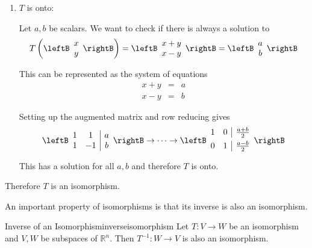\begin{solution}
\begin{enumerate}
\item $T$ is onto:

Let $a,b$ be scalars. We want to check if there is always a solution to 
\[
T  \left( \leftB \begin{array}{c}
x \\
y
\end{array} \rightB \right) = \leftB \begin{array}{c}
x + y\\
x - y 
\end{array} \rightB = \leftB \begin{array}{c}
a \\
b
\end{array} \rightB
\]

This can be represented as the system of equations 
\begin{eqnarray*}
x + y &=& a\\
x - y &=& b
\end{eqnarray*}

Setting up the augmented matrix and row reducing gives
\[
\leftB \begin{array}{cc|c}
1 & 1 & a \\
1 & -1 & b
\end{array} \rightB \rightarrow \cdots \rightarrow
\leftB \begin{array}{cc|c}
1 & 0 & \vspace{0.05in}\frac{a+b}{2} \\
0 & 1 & \vspace{0.05in}\frac{a-b}{2}
\end{array} \rightB
\]
This has a solution for all $a,b$ and therefore $T$ is onto. 
\end{enumerate}

Therefore $T$ is an isomorphism.
\end{solution}

An important property of isomorphisms is that its inverse is also an isomorphism. 

\begin{proposition}{Inverse of an Isomorphism}{inverseisomorphism}
Let $T:V\rightarrow W$ be an isomorphism and $V,W$ be subspaces of $\mathbb{R}^n$. Then $T^{-1}:W\rightarrow V$ is
also an isomorphism.
\end{proposition}

